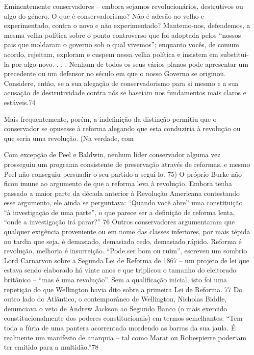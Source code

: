  \par 
Eminentemente conservadores – embora sejamos revolucionários, destrutivos ou algo do género. O que é conservadorismo? Não é adesão ao velho e experimentado, contra o novo e não experimentado? Mantemo-nos, defendemos, a mesma velha política sobre o ponto controverso que foi adoptada pelos “nossos pais que moldaram o governo sob o qual vivemos”; enquanto vocês, de comum acordo, rejeitam, exploram e cuspem nessa velha política e insistem em substituí-la por algo novo. . . . Nenhum de todos os seus vários planos pode apresentar um precedente ou um defensor no século em que o nosso Governo se originou. Considere, então, se a sua alegação de conservadorismo para si mesmo e a sua acusação de destrutividade contra nós se baseiam nos fundamentos mais claros e estáveis.{\color{blue}74}
 \par 
Mais frequentemente, porém, a indefinição da distinção permitiu que o conservador se opusesse à reforma alegando que esta conduziria à revolução ou que seria uma revolução. (Na verdade, com
 \par 
Com excepção de Peel e Baldwin, nenhum líder conservador alguma vez prosseguiu um programa consistente de preservação através de reformas, e mesmo Peel não conseguiu persuadir o seu partido a segui-lo. {\color{blue}75}) O próprio Burke não ficou imune ao argumento de que a reforma leva à revolução. Embora tenha passado a maior parte da década anterior à Revolução Americana contestando esse argumento, ele ainda se perguntava: “Quando você abre” uma constituição “à investigação de uma parte”, o que parece ser a definição de reforma lenta, “onde a investigação irá parar?” {\color{blue}76} Outros conservadores argumentaram que qualquer exigência proveniente ou em nome das classes inferiores, por mais tépida ou tardia que seja, é demasiado, demasiado cedo, demasiado rápido. Reforma é revolução, melhoria é insurreição. “Pode ser bom ou ruim”, escreveu um sombrio Lord Carnarvon sobre a Segunda Lei de Reforma de 1867 – um projeto de lei que estava sendo elaborado há vinte anos e que triplicou o tamanho do eleitorado britânico – “mas é uma revolução”. Sem a qualificação inicial, isto foi uma repetição do que Wellington havia dito sobre a primeira Lei de Reforma. {\color{blue}77} Do outro lado do Atlântico, o contemporâneo de Wellington, Nicholas Biddle, denunciava o veto de Andrew Jackson ao Segundo Banco (o mais exercido constitucionalmente dos poderes constitucionais) em termos semelhantes: “Tem toda a fúria de uma pantera acorrentada mordendo as barras da sua jaula. É realmente um manifesto de anarquia – tal como Marat ou Robespierre poderiam ter emitido para a multidão.”{\color{blue}78}
